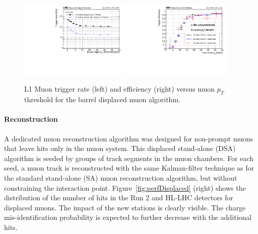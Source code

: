 \begin{figure}[t]
\begin{center}
  \includegraphics[width=0.47\textwidth]{figures/cmsupgrade/TDR-17-003_fig_7_11_a_Prompt_L1Mu_trigger_rate_pt__L1Mu__L1Mu2st__DisplacedL1MuDirectionBased_MB1_MB2_MB3_MB4_combined_eta0to0p9.pdf} \hfill
  \includegraphics[width=0.47\textwidth]{figures/cmsupgrade/TDR-17-003_fig_7_11_b_L1MuonTDR2017Displaced_L1MuPt20_SimMuPt_DT1_DT2_DT3_DT4_combined_eta0to0p9_dxy5to50_looseVeto.pdf}
  \caption{L1 Muon trigger rate (left) and efficiency (right) %
versus muon $p_T$ threshold for the barrel displaced muon algorithm.}
  \label{fig:cmsL1mu}
\end{center}
\end{figure}


\paragraph{Reconstruction}

A dedicated muon reconstruction algorithm was designed for non-prompt muons that leave hits only in the muon system. This displaced stand-alone (DSA) algorithm is seeded by groups of track segments in the muon chambers. For each seed, a muon track is reconstructed with the same Kalman-filter technique as for the standard stand-alone (SA) muon reconstruction algorithm, but without constraining the interaction point. Figure~\ref{fig:perfDisplaced} (right) shows the distribution of the number of hits in the Run 2 and HL-LHC detectors for displaced muons. The impact of the new stations is clearly visible. The charge mis-identification probability is expected to further decrease with the additional hits.

